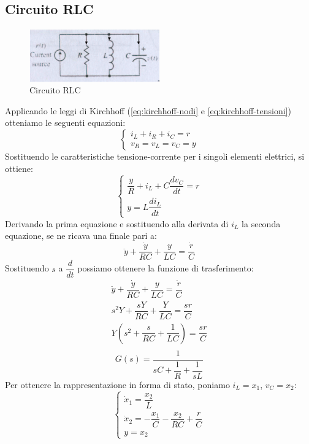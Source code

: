 \documentclass[a4paper]{report}
\begin{document}
\subsection{Circuito RLC}
\begin{figure}[!b]
\centering
\includegraphics[width=0.5\textwidth]{./images/circuitorlc.png}
\caption{Circuito RLC\label{fig:circuitorlc}}
\end{figure}
Applicando le leggi di Kirchhoff (\ref{eq:kirchhoff-nodi} e
\ref{eq:kirchhoff-tensioni}) otteniamo le seguenti equazioni:
\[
  \left\{
  \begin{array}{l}
    i_L + i_R + i_C = r\\
    v_R = v_L = v_C = y
  \end{array}
  \right .
\]
Sostituendo le caratteristiche tensione-corrente per i singoli
elementi elettrici, si ottiene:
\[
  \left\{
  \begin{array}{l}
   \dfrac{y}{R} + i_L + C \dfrac{dv_C}{dt} = r\\
   y = L \dfrac{di_L}{dt}
  \end{array}
  \right .
\]
Derivando la prima equazione e sostituendo alla derivata di $i_L$ la
seconda equazione, se ne ricava una finale pari a:
\[
  \ddot{y} + \dfrac{\dot{y}}{RC} + \dfrac{y}{LC} = \dfrac{\dot{r}}{C}
\]
Sostituendo $s$ a $\dfrac{d}{dt}$ possiamo ottenere la funzione di
trasferimento: 
\[
  \begin{array}{l}
    \ddot{y} + \dfrac{\dot{y}}{RC} + \dfrac{y}{LC} =
    \dfrac{\dot{r}}{C}\\
    s^2 Y + \dfrac{sY}{RC} + \dfrac{Y}{LC} = \dfrac{sr}{C}\\
    Y(s^2 + \dfrac{s}{RC} + \dfrac{1}{LC}) = \dfrac{sr}{C}\\
  \end{array}
\]
\begin{equation}\label{eq:fdt-circuitorlc}
  G(s) = \dfrac{1}{sC + \dfrac{1}{R} + \dfrac{1}{sL}}
\end{equation}
Per ottenere la rappresentazione in forma di stato, poniamo $i_L =
x_1$, $v_C = x_2$:
\[
  \left\{
  \begin{array}{l}
    \dot{x}_1 = \dfrac{x_2}{L}\\
    \dot{x}_2 = - \dfrac{x_1}{C} - \dfrac{x_2}{RC} + \dfrac{r}{C}\\
    y = x_2
  \end{array}
  \right .
\]
\end{document}
